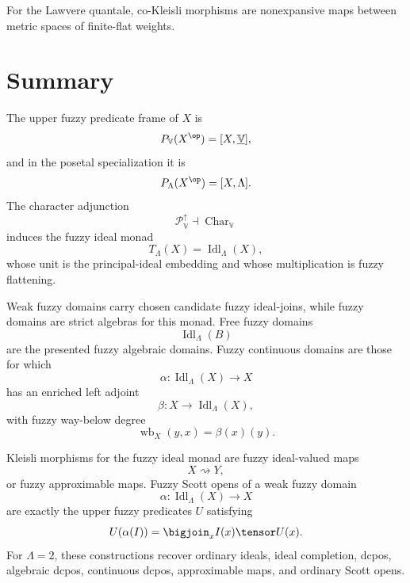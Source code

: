 \begin{example}
\label{ex:lawvere-cokleisli}
For the Lawvere quantale, co-Kleisli morphisms are nonexpansive maps between metric
spaces of finite-flat weights.
\end{example}

\section{Summary}
\label{sec:summary-fuzzy-ideal-monad-domains-scott}

The upper fuzzy predicate frame of \(X\) is
\[
    P_{\mathbb V}(X^{\op})
    =
    [X,\underline{\mathbb V}],
\]
and in the posetal specialization it is
\[
    P_\Lambda(X^{\op})
    =
    [X,\Lambda].
\]
The character adjunction
\[
    \mathcal P_{\mathbb V}^{\uparrow}
    \dashv
    \operatorname{Char}_{\mathbb V}
\]
induces the fuzzy ideal monad
\[
    T_\Lambda(X)
    =
    \operatorname{Idl}_\Lambda(X),
\]
whose unit is the principal-ideal embedding and whose multiplication is fuzzy
flattening.

Weak fuzzy domains carry chosen candidate fuzzy ideal-joins, while fuzzy domains
are strict algebras for this monad.  Free fuzzy domains
\[
    \operatorname{Idl}_\Lambda(B)
\]
are the presented fuzzy algebraic domains.  Fuzzy continuous domains are those for
which
\[
    \alpha:\operatorname{Idl}_\Lambda(X)\to X
\]
has an enriched left adjoint
\[
    \beta:X\to\operatorname{Idl}_\Lambda(X),
\]
with fuzzy way-below degree
\[
    \operatorname{wb}_X(y,x)=\beta(x)(y).
\]

Kleisli morphisms for the fuzzy ideal monad are fuzzy ideal-valued maps
\[
    X\rightsquigarrow Y,
\]
or fuzzy approximable maps.  Fuzzy Scott opens of a weak fuzzy domain
\[
    \alpha:\operatorname{Idl}_\Lambda(X)\to X
\]
are exactly the upper fuzzy predicates \(U\) satisfying
\[
    U(\alpha(I))
    =
    \bigjoin_x I(x)\tensor U(x).
\]
For \(\Lambda=2\), these constructions recover ordinary ideals, ideal completion,
dcpos, algebraic dcpos, continuous dcpos, approximable maps, and ordinary Scott
opens.